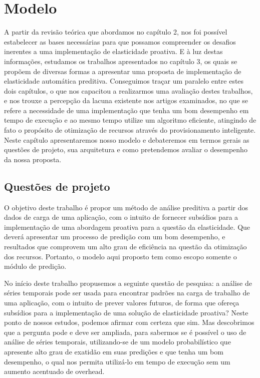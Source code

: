 \documentclass[twoside,english,brazilian]{UNISINOSmonografia}
\begin{document}
\chapter{Modelo}
A partir da revisão teórica que abordamos no capítulo 2, nos foi possível estabelecer as bases necessárias para que possamos compreender os desafios inerentes a uma implementação de elasticidade proativa. E à luz destas informações, estudamos os trabalhos apresentados no capítulo 3, os quais se propõem de diversas formas a apresentar uma proposta de implementação de elasticidade automática preditiva. Conseguimos traçar um paralelo entre estes dois capítulos, o que nos capacitou a realizarmos uma avaliação destes trabalhos, e nos trouxe a percepção da lacuna existente nos artigos examinados, no que se refere a necessidade de uma implementação que tenha um bom desempenho em tempo de execução e ao mesmo tempo utilize um algoritmo eficiente, atingindo de fato o propósito de otimização de recursos através do provisionamento inteligente. Neste capítulo apresentaremos nosso modelo e debateremos em termos gerais as questões de projeto, sua arquitetura e como pretendemos avaliar o desempenho da nossa proposta.

\section{Questões de projeto}
O objetivo deste trabalho é propor um método de análise preditiva a partir dos dados de carga de uma aplicação, com o intuito de fornecer subsídios para a implementação de uma abordagem proativa para a questão da elasticidade. Que deverá apresentar um processo de predição com um bom desempenho, e resultados que comprovem um alto grau de eficiência na questão da otimização dos recursos. Portanto, o modelo aqui proposto tem como escopo somente o módulo de predição.

No início deste trabalho propusemos a seguinte questão de pesquisa: a análise de séries temporais pode ser usada para encontrar padrões na carga de trabalho de uma aplicação, com o intuito de prever valores futuros, de forma que ofereça subsídios para a implementação de uma solução de elasticidade proativa? Neste ponto de nossos estudos, podemos afirmar com certeza que sim. Mas descobrimos que a pergunta pode e deve ser ampliada, para sabermos se é possível o uso de análise de séries temporais, utilizando-se de um modelo probabilístico que apresente alto grau de exatidão em suas predições e que tenha um bom desempenho, o qual nos permita utilizá-lo em tempo de execução sem um aumento acentuado de overhead.
\end{document}
